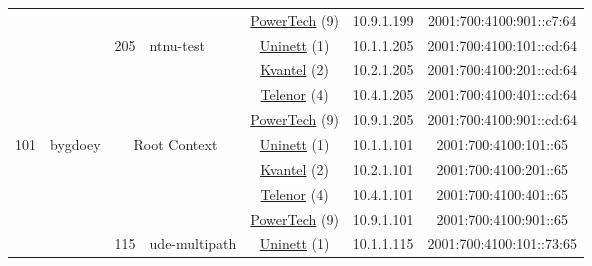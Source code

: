 \begin{small}
\begin{center}
\begin{longtable}{|c|c|c|c|c|c|c|c|}
  &  &  &  & \multicolumn{2}{|c|}{\tiny{\href{http://www.powertech.no}{PowerTech} (9)}} & \tiny{10.9.1.199} & \tiny{2001:700:4100:901::c7:64} \\* \cline{3-3}\cline{4-4}\cline{5-5}\cline{6-6}\cline{7-7}\cline{8-8}
  &  & \multirow{4}{*}{\tiny{205}} & \multicolumn{1}{|l|}{\multirow{4}{*}{\tiny{ntnu-test}}} & \multicolumn{2}{|c|}{\tiny{\href{https://www.uninett.no}{Uninett} (1)}} & \tiny{10.1.1.205} & \tiny{2001:700:4100:101::cd:64} \\* \cline{5-5}\cline{6-6}\cline{7-7}\cline{8-8}
  &  &  &  & \multicolumn{2}{|c|}{\tiny{\href{http://kvantel.no}{Kvantel} (2)}} & \tiny{10.2.1.205} & \tiny{2001:700:4100:201::cd:64} \\* \cline{5-5}\cline{6-6}\cline{7-7}\cline{8-8}
  &  &  &  & \multicolumn{2}{|c|}{\tiny{\href{https://www.telenor.no}{Telenor} (4)}} & \tiny{10.4.1.205} & \tiny{2001:700:4100:401::cd:64} \\* \cline{5-5}\cline{6-6}\cline{7-7}\cline{8-8}
  &  &  &  & \multicolumn{2}{|c|}{\tiny{\href{http://www.powertech.no}{PowerTech} (9)}} & \tiny{10.9.1.205} & \tiny{2001:700:4100:901::cd:64} \\ \hline
 \multirow{48}{*}{\tiny{101}} & \multicolumn{1}{|l|}{\multirow{48}{*}{\tiny{bygdoey}}} & \multicolumn{2}{|c|}{\multirow{4}{*}{\tiny{Root Context}}} & \multicolumn{2}{|c|}{\tiny{\href{https://www.uninett.no}{Uninett} (1)}} & \tiny{10.1.1.101} & \tiny{2001:700:4100:101::65} \\* \cline{5-5}\cline{6-6}\cline{7-7}\cline{8-8}
  &  & \multicolumn{2}{|c|}{} & \multicolumn{2}{|c|}{\tiny{\href{http://kvantel.no}{Kvantel} (2)}} & \tiny{10.2.1.101} & \tiny{2001:700:4100:201::65} \\* \cline{5-5}\cline{6-6}\cline{7-7}\cline{8-8}
  &  & \multicolumn{2}{|c|}{} & \multicolumn{2}{|c|}{\tiny{\href{https://www.telenor.no}{Telenor} (4)}} & \tiny{10.4.1.101} & \tiny{2001:700:4100:401::65} \\* \cline{5-5}\cline{6-6}\cline{7-7}\cline{8-8}
  &  & \multicolumn{2}{|c|}{} & \multicolumn{2}{|c|}{\tiny{\href{http://www.powertech.no}{PowerTech} (9)}} & \tiny{10.9.1.101} & \tiny{2001:700:4100:901::65} \\* \cline{3-3}\cline{4-4}\cline{5-5}\cline{6-6}\cline{7-7}\cline{8-8}
  &  & \multirow{4}{*}{\tiny{115}} & \multicolumn{1}{|l|}{\multirow{4}{*}{\tiny{ude-multipath}}} & \multicolumn{2}{|c|}{\tiny{\href{https://www.uninett.no}{Uninett} (1)}} & \tiny{10.1.1.115} & \tiny{2001:700:4100:101::73:65} \\* \cline{5-5}\cline{6-6}\cline{7-7}\cline{8-8}

\end{longtable}
\end{center}
\end{small}

